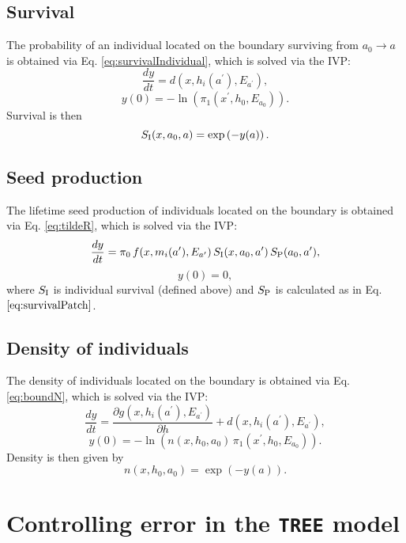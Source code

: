 \documentclass[10pt,twoside]{article}
\begin{document}
\subsection{Survival}\label{survival}

The probability of an individual located on the boundary surviving from
\(a_0 \rightarrow a\) is obtained via Eq. \ref{eq:survivalIndividual},
which is solved via the IVP:
\[\frac{dy}{dt} = d(x,h_i(a^\prime), E_{a^\prime}),\]
\[ y(0) = - \ln\left(\pi_1 (x^\prime,h_0, E_{a_0})\right) .\]
Survival is then \[ S_{\rm I} (x, a_0, a) = \exp\left(- y(a) \right).\]

\subsection{Seed production}\label{seed-production}

The lifetime seed production of individuals located on the boundary is
obtained via Eq. \ref{eq:tildeR}, which is solved via the IVP:
\[\frac{dy}{dt} = \pi_0 \,f(x, m_i(a^\prime), E_{a^\prime}) \, S_{\rm I} (x, a_0, a^\prime) \, S_{\rm P} (a_0,a^\prime),\]
\[ y(0) = 0,\] where \(S_{\rm I}\) is individual survival (defined
above) and \(S_{\rm P}\) is calculated as in Eq.
\(\ref{eq:survivalPatch}\).

\subsection{Density of individuals}\label{density-of-individuals}

The density of individuals located on the boundary is obtained via Eq.
\ref{eq:boundN}, which is solved via the IVP:
\[\frac{dy}{dt} = \frac{\partial g(x,h_i(a^\prime), E_{a^\prime})}{\partial h} +d(x,h_i(a^\prime),E_{a^\prime}),\]
\[ y(0) = -\ln\left(n(x,h_0 ,a_0) \, \pi_1 (x^\prime,h_0, E_{a_0}) \right).\]
Density is then given by \[n(x,h_0 ,a_0) =\exp(-y(a)).\]

\section{Controlling error in the \texttt{TREE}
model}\label{controlling-error-in-the-tree-model}
\end{document}
